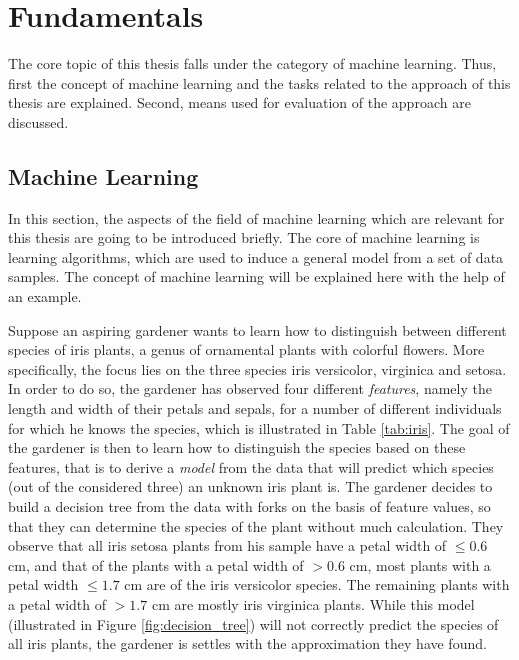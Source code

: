 \chapter{Fundamentals}
\label{sec:fundamentals}

The core topic of this thesis falls under the category of machine learning. Thus, first the concept of machine learning and the tasks related to the approach of this thesis are explained. Second, means used for evaluation of the approach are discussed.

\section{Machine Learning}
In this section, the aspects of the field of machine learning which are relevant for this thesis are going to be introduced briefly. The core of machine learning is learning algorithms, which are used to induce a general model from a set of data samples. The concept of machine learning will be explained here with the help of an example. %

Suppose an aspiring gardener wants to learn how to distinguish between different species of iris plants, a genus of ornamental plants with colorful flowers. More specifically, the focus lies on the three species iris versicolor, virginica and setosa. In order to do so, the gardener has observed four different \textit{features}, namely the length and width of their petals and sepals, for a number of different individuals for which he knows the species, which is illustrated in Table \ref{tab:iris}. The goal of the gardener is then to learn how to distinguish the species based on these features, that is to derive a \textit{model} from the data that will predict which species (out of the considered three) an unknown iris plant is. The gardener decides to build a decision tree from the data with forks on the basis of feature values, so that they can determine the species of the plant without much calculation. They observe that all iris setosa plants from his sample have a petal width of $\leq 0.6 $ cm, and that of the plants with a petal width of $>0.6$ cm, most plants with a petal width $\leq 1.7$ cm are of the iris versicolor species. The remaining plants with a petal width of $>1.7$ cm are mostly iris virginica plants. While this model (illustrated in Figure \ref{fig:decision_tree}) will not correctly predict the species of all iris plants, the gardener is settles with the approximation they have found.

